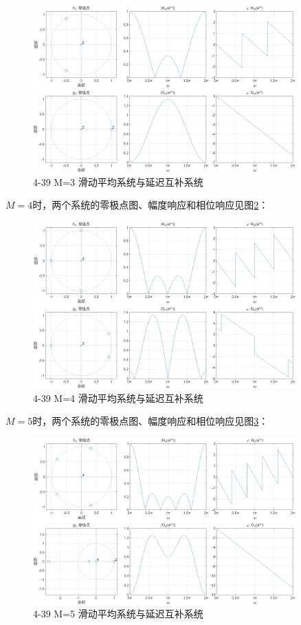 \documentclass[UTF8,12pt,a4paper]{ctexart}
\begin{document}
\begin{figure}[htbp]
    \centering
    \includegraphics[width=0.9\textwidth]{4-39_M=3.png}
    \caption{4-39 M=3 滑动平均系统与延迟互补系统}
    \label{fig:4-39-m3}
\end{figure}

$M=4$时，两个系统的零极点图、幅度响应和相位响应见图\ref{fig:4-39-m4}：

\begin{figure}[htbp]
    \centering
    \includegraphics[width=0.9\textwidth]{4-39_M=4.png}
    \caption{4-39 M=4 滑动平均系统与延迟互补系统}
    \label{fig:4-39-m4}
\end{figure}

$M=5$时，两个系统的零极点图、幅度响应和相位响应见图\ref{fig:4-39-m5}：

\begin{figure}[htbp]
    \centering
    \includegraphics[width=0.9\textwidth]{4-39_M=5.png}
    \caption{4-39 M=5 滑动平均系统与延迟互补系统}
    \label{fig:4-39-m5}
\end{figure}
\end{document}

